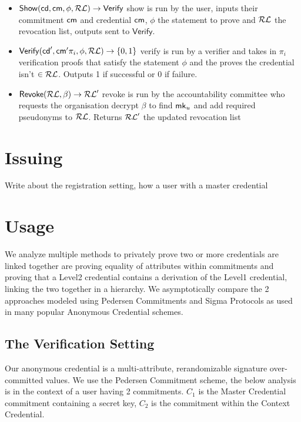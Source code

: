 \begin{itemize}
    \item $\mathsf{Show}(\mathsf{cd}, \mathsf{cm}, \phi, \mathcal{RL}) \to \mathsf{Verify}$ show is run by the user, inputs their commitment $\mathsf{cm}$ and credential $\mathsf{cm}$, $\phi$ the statement to prove and $\mathcal{RL}$ the revocation list, outputs sent to $\mathsf{Verify}$.

    \item $\mathsf{Verify}(\mathsf{cd}', \mathsf{cm}' \pi_i, \phi, \mathcal{RL}) \to \{0,1\}$ verify is run by a verifier and takes in $\pi_i$ verification proofs that satisfy the statement $\phi$ and the proves the credential isn't $\in \mathcal{RL}$. Outputs 1 if successful or 0 if failure.

    \item $\mathsf{Revoke}(\mathcal{RL}, \beta) \to \mathcal{RL}'$ revoke is run by the accountability committee who requests the organisation decrypt $\beta$ to find $\mathsf{mk}_u$ and add required pseudonyms to $\mathcal{RL}$. Returns $\mathcal{RL}'$ the updated revocation list
\end{itemize}



\newpage

\newpage
\section{Issuing}
Write about the registration setting, how a user with a master credential 

\newpage
\section{Usage}
We analyze multiple methods to privately prove two or more credentials are linked together are proving equality of attributes within commitments and proving that a Level2 credential contains a derivation of the Level1 credential, linking the two together in a hierarchy. 
We asymptotically compare the 2 approaches modeled using Pedersen Commitments and Sigma Protocols as used in many popular Anonymous Credential schemes.

\subsection{The Verification Setting}
Our anonymous credential is a multi-attribute, rerandomizable signature over-committed values. We use the Pedersen Commitment scheme, the below analysis is in the context of a user having 2 commitments. $C_1$ is the Master Credential commitment containing a secret key, $C_2$ is the commitment within the Context Credential. 


